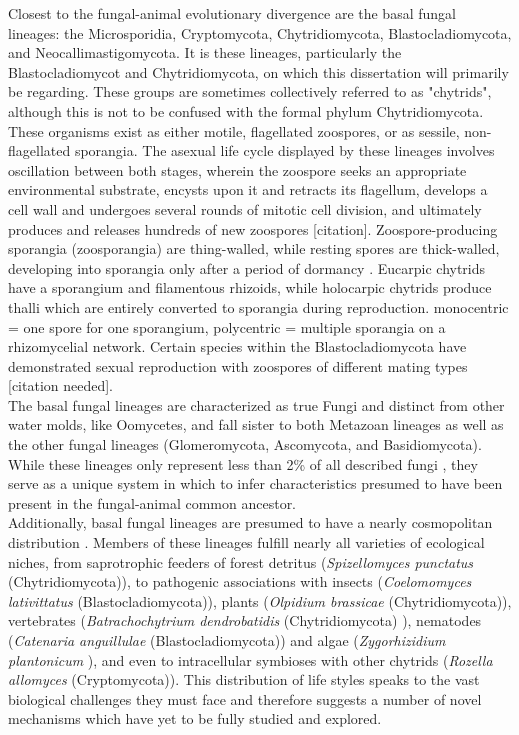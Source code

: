 \indent Closest to the fungal-animal evolutionary divergence are the basal fungal lineages: the Microsporidia, Cryptomycota, Chytridiomycota, Blastocladiomycota, and Neocallimastigomycota. It is these lineages, particularly the Blastocladiomycot and Chytridiomycota, on which this dissertation will primarily be regarding. These groups are sometimes collectively referred to as "chytrids", although this is not to be confused with the formal phylum Chytridiomycota. These organisms exist as either motile, flagellated zoospores, or as sessile, non-flagellated sporangia. The asexual life cycle displayed by these lineages involves oscillation between both stages, wherein the zoospore seeks an appropriate environmental substrate, encysts upon it and retracts its flagellum, develops a cell wall and undergoes several rounds of mitotic cell division, and ultimately produces and releases hundreds of new zoospores [citation]. Zoospore-producing sporangia (zoosporangia) are thing-walled, while resting spores are thick-walled, developing into sporangia only after a period of dormancy \cite{James2006}. Eucarpic chytrids have a sporangium and filamentous rhizoids, while holocarpic chytrids produce thalli which are entirely converted to sporangia during reproduction. monocentric = one spore for one sporangium, polycentric = multiple sporangia on a rhizomycelial network. Certain species within the Blastocladiomycota have demonstrated sexual reproduction with zoospores of different mating types [citation needed].\\
\indent The basal fungal lineages are characterized as true Fungi and distinct from other water molds, like Oomycetes, and fall sister to both Metazoan lineages as well as the other fungal lineages (Glomeromycota, Ascomycota, and Basidiomycota). While these lineages only represent less than 2\% of all described fungi \cite{Stajich2009}, they serve as a unique system in which to infer characteristics presumed to have been present in the fungal-animal common ancestor.\\
\indent Additionally, basal fungal lineages are presumed to have a nearly cosmopolitan distribution \cite{Powell1993}. Members of these lineages fulfill nearly all varieties of ecological niches, from saprotrophic feeders of forest detritus (\textit{Spizellomyces punctatus} (Chytridiomycota)), to pathogenic associations with insects (\textit{Coelomomyces lativittatus} (Blastocladiomycota)), plants (\textit{Olpidium brassicae} (Chytridiomycota)), vertebrates (\textit{Batrachochytrium dendrobatidis} (Chytridiomycota) \cite{Longcore1999}), nematodes (\textit{Catenaria anguillulae} (Blastocladiomycota)) and algae (\textit{Zygorhizidium plantonicum} \cite{Canter1967}), and even to intracellular symbioses with other chytrids (\textit{Rozella allomyces} (Cryptomycota)). This distribution of life styles speaks to the vast biological challenges they must face and therefore suggests a number of novel mechanisms which have yet to be fully studied and explored. \\
